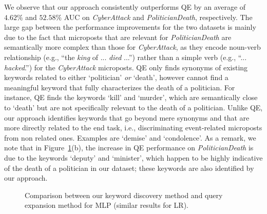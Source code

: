 \documentclass[letterpaper]{article}
\begin{document}
We observe that our approach consistently outperforms QE by an average of $4.62\%$ and $52.58\%$ AUC on \emph{CyberAttack} and \emph{PoliticianDeath}, respectively. The large gap between the performance improvements for the two datasets is mainly due to the fact that microposts that are relevant for \emph{PoliticianDeath} are semantically more complex than those for \emph{CyberAttack}, as they encode noun-verb relationship (e.g., ``the \emph{king} of ... \emph{died} ...'') rather than a simple verb (e.g., ``... \emph{hacked}.'') for the \emph{CyberAttack} microposts. QE only finds synonyms of existing keywords related to either \lq politician' \emph{or} \lq death', however cannot find a meaningful keyword that fully characterizes the death of a politician. For instance, QE finds the keywords \lq kill' and \lq murder', which are semantically close to \lq death' but are not specifically relevant to the death of a politician. Unlike QE, our approach identifies keywords that go beyond mere synonyms and that are more directly related to the end task, i.e., discriminating event-related microposts from non related ones. Examples are \lq demise' and \lq condolence'. As a remark, we note that in Figure~\ref{fig:Q2}(b), the increase in QE performance on \emph{PoliticianDeath} is due to the keywords \lq deputy' and \lq minister', which happen to be highly indicative of the death of a politician in our dataset; these keywords are also identified by our approach. 


\begin{figure}[t!]
        \centering
        \caption{Comparison between our keyword discovery method and query expansion method for MLP (similar results for LR).}
        \label{fig:Q2}
\end{figure}
\end{document}
